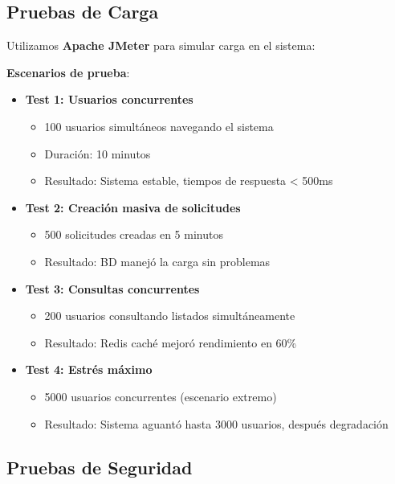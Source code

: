 \subsection{Pruebas de Carga}

Utilizamos \textbf{Apache JMeter} para simular carga en el sistema:

\textbf{Escenarios de prueba}:

\begin{itemize}
    \item \textbf{Test 1: Usuarios concurrentes}
    \begin{itemize}
        \item 100 usuarios simultáneos navegando el sistema
        \item Duración: 10 minutos
        \item Resultado: Sistema estable, tiempos de respuesta < 500ms
    \end{itemize}
    
    \item \textbf{Test 2: Creación masiva de solicitudes}
    \begin{itemize}
        \item 500 solicitudes creadas en 5 minutos
        \item Resultado: BD manejó la carga sin problemas
    \end{itemize}
    
    \item \textbf{Test 3: Consultas concurrentes}
    \begin{itemize}
        \item 200 usuarios consultando listados simultáneamente
        \item Resultado: Redis caché mejoró rendimiento en 60\%
    \end{itemize}
    
    \item \textbf{Test 4: Estrés máximo}
    \begin{itemize}
        \item 5000 usuarios concurrentes (escenario extremo)
        \item Resultado: Sistema aguantó hasta 3000 usuarios, después degradación
    \end{itemize}
\end{itemize}

\subsection{Pruebas de Seguridad}

